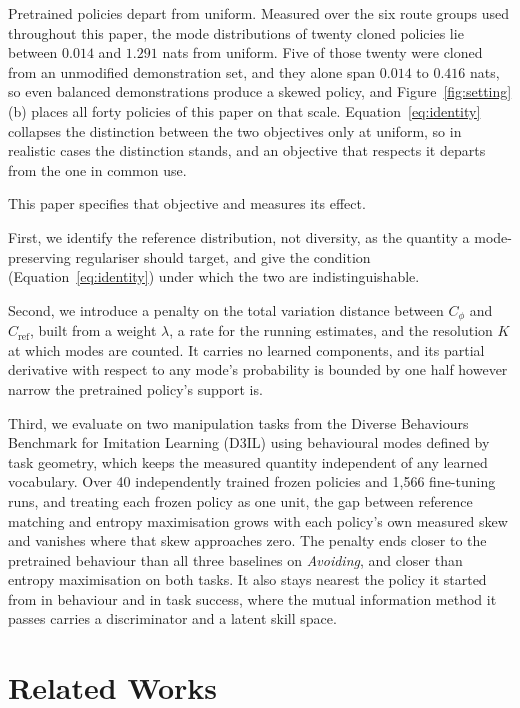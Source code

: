 \documentclass[preprint,12pt]{elsarticle}
\begin{document}
Pretrained policies depart from uniform. Measured over the six route groups
used throughout this paper, the mode distributions of twenty cloned policies
lie between $0.014$ and $1.291$ nats from uniform. Five of those twenty were cloned from an
unmodified demonstration set, and they alone span $0.014$ to $0.416$ nats, so
even balanced demonstrations produce a skewed policy, and
Figure~\ref{fig:setting}(b) places all forty policies of this paper on that
scale. Equation~\ref{eq:identity}
collapses the distinction between the two objectives only at uniform, so in
realistic cases the distinction stands, and an objective that respects it
departs from the one in common use.

This paper specifies that objective and measures its effect.

First, we identify the reference distribution, not diversity, as the quantity a
mode-preserving regulariser should target, and give the condition
(Equation~\ref{eq:identity}) under which the two are indistinguishable.

Second, we introduce a penalty on the total variation distance between $C_\phi$
and $C_{\mathrm{ref}}$, built from a weight $\lambda$, a rate for the running
estimates, and the resolution $K$ at which modes are counted. It
carries no learned components, and its partial derivative with respect to any
mode's probability is bounded by one half however narrow the pretrained
policy's support is.

Third, we evaluate on two manipulation tasks from the Diverse Behaviours
Benchmark for Imitation Learning (D3IL) \citep{jia2024d3il} using behavioural
modes defined by task geometry, which keeps the measured quantity independent of
any learned vocabulary. Over 40 independently trained frozen policies and 1,566
fine-tuning runs, and treating each frozen policy as one unit, the gap between
reference matching and entropy maximisation grows with each policy's own
measured skew and vanishes where that skew approaches zero. The penalty ends
closer to the pretrained behaviour than all three baselines on \emph{Avoiding},
and closer than entropy maximisation on both tasks. It also stays nearest the
policy it started from in behaviour and in task success, where the mutual
information method it passes carries a discriminator and a latent skill
space.

\section{Related Works}\label{sec:related}
\end{document}
